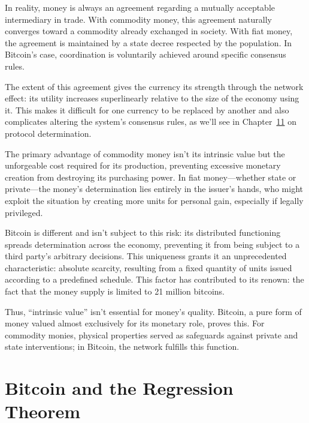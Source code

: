 \documentclass[
  a5paper,
  smalldemyvopaper,10pt,twoside,onecolumn,openright,extrafontsizes,hidelinks]{memoir}
\begin{document}
In reality, money is always an agreement regarding a mutually acceptable
intermediary in trade. With commodity money, this agreement naturally
converges toward a commodity already exchanged in society. With fiat
money, the agreement is maintained by a state decree respected by the
population. In Bitcoin's case, coordination is voluntarily achieved
around specific consensus rules.

The extent of this agreement gives the currency its strength through the
network effect: its utility increases superlinearly relative to the size
of the economy using it. This makes it difficult for one currency to be
replaced by another and also complicates altering the system's consensus
rules, as we'll see in Chapter~\hyperref[ch:determination]{11} on
protocol determination.

The primary advantage of commodity money isn't its intrinsic value but
the unforgeable cost required for its production, preventing excessive
monetary creation from destroying its purchasing power. In fiat
money---whether state or private---the money's determination lies
entirely in the issuer's hands, who might exploit the situation by
creating more units for personal gain, especially if legally privileged.

Bitcoin is different and isn't subject to this risk: its distributed
functioning spreads determination across the economy, preventing it from
being subject to a third party's arbitrary decisions. This uniqueness
grants it an unprecedented characteristic: absolute scarcity, resulting
from a fixed quantity of units issued according to a predefined
schedule. This factor has contributed to its renown: the fact that the
money supply is limited to 21 million bitcoins.

Thus, ``intrinsic value'' isn't essential for money's quality. Bitcoin,
a pure form of money valued almost exclusively for its monetary role,
proves this. For commodity monies, physical properties served as
safeguards against private and state interventions; in Bitcoin, the
network fulfills this function.

\section*{Bitcoin and the Regression
Theorem}\label{bitcoin-et-le-theoreme-de-regression}

\end{document}
